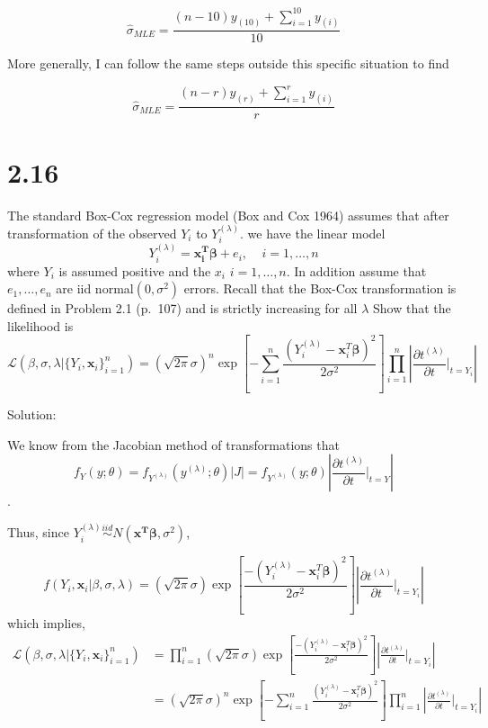 \documentclass[
  letterpaper,
  DIV=11,
  numbers=noendperiod]{scrreprt}
\begin{document}
\[\hat{\sigma}_{MLE} = \frac{(n-10)y_{(10)}+ \sum_{i=1}^{10}y_{(i)}}{10}\]

More generally, I can follow the same steps outside this specific
situation to find

\[\hat{\sigma}_{MLE} = \frac{(n-r)y_{(r)}+ \sum_{i=1}^{r}y_{(i)}}{r}\]

\newpage

\hypertarget{section-5}{%
\section{2.16}\label{section-5}}

The standard Box-Cox regression model (Box and Cox 1964) assumes that
after transformation of the observed \(Y_i\) to \(Y_i^{(\lambda)}\). we
have the linear model
\[ Y_i^{(\lambda)} = \mathbf{x_i^T \beta} + e_i,~~~~~ i =1,\dots,n \]
where \(Y_i\) is assumed positive and the \(x_i\) \(i= 1, \dots, n\). In
addition assume that \(e_1,\dots,e_n\) are iid normal\((0, \sigma^2)\)
errors. Recall that the Box-Cox transformation is defined in Problem 2.1
(p.~107) and is strictly increasing for all \(\lambda\) Show that the
likelihood is
\[\mathcal L \left(\beta,\sigma,\lambda| \{Y_i, \mathbf x_i\}_{i=1}^n \right) = \left(\sqrt{2\pi}\sigma\right)^n \exp\left[-\sum_{i=1}^n \frac{ \left(Y_i^{(\lambda)} - \mathbf{x}_i^T\mathbf \beta \right)^2}{2 \sigma^2}  \right] \prod_{i=1}^n \left|\frac{\partial t^{(\lambda)}}{\partial t} \bigg\rvert_{t= Y_i} \right|\]

Solution:

We know from the Jacobian method of transformations that
\[f_Y(y;\theta) = f_{Y^{(\lambda)}} (y^{(\lambda)};\theta)\left|J\right|=f_{Y^{(\lambda)}} (y;\theta)\left|\frac{\partial t^{(\lambda)}}{\partial t} \bigg\rvert_{t= Y}\right|\].

Thus, since
\(Y_i^{(\lambda)} \overset {iid}\sim N(\mathbf{x^T \beta}, \sigma^2)\),

\[f\left(Y_i, \mathbf x_i|\beta,\sigma,\lambda \right) = \left(\sqrt{2\pi}\sigma\right) \exp\left[\frac{- \left(Y_i^{(\lambda)} - \mathbf{x}_i^T\mathbf \beta \right)^2}{2 \sigma^2}  \right] \left|\frac{\partial t^{(\lambda)}}{\partial t} \bigg\rvert_{t= Y_i} \right|\]
which implies,
\[\begin{aligned}\mathcal L \left(\beta,\sigma,\lambda| \{Y_i, \mathbf x_i\}_{i=1}^n \right)
&= \prod_{i=1}^n \left(\sqrt{2\pi}\sigma\right) \exp\left[\frac{- \left(Y_i^{(\lambda)} - \mathbf{x}_i^T\mathbf \beta \right)^2}{2 \sigma^2}  \right] \left|\frac{\partial t^{(\lambda)}}{\partial t} \bigg\rvert_{t= Y_i} \right|\\
&= \left(\sqrt{2\pi}\sigma\right)^n \exp\left[-\sum_{i=1}^n \frac{ \left(Y_i^{(\lambda)} - \mathbf{x}_i^T\mathbf \beta \right)^2}{2 \sigma^2}  \right] \prod_{i=1}^n \left|\frac{\partial t^{(\lambda)}}{\partial t} \bigg\rvert_{t= Y_i} \right|
\end{aligned}\]
\end{document}
